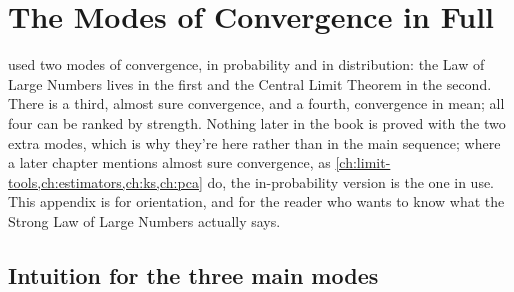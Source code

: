 \chapter{The Modes of Convergence in Full}
\label{app:modes}

 used two modes of convergence, in probability and in distribution: the Law of Large Numbers lives in the first and the Central Limit Theorem in the second.
There is a third, almost sure convergence, and a fourth, convergence in mean; all four can be ranked by strength.
Nothing later in the book is proved with the two extra modes, which is why they're here rather than in the main sequence; where a later chapter mentions almost sure convergence, as \cref{ch:limit-tools,ch:estimators,ch:ks,ch:pca} do, the in-probability version is the one in use.
This appendix is for orientation, and for the reader who wants to know what the Strong Law of Large Numbers actually says.

\section{Intuition for the three main modes}
\label{sec:conv-intuition}

